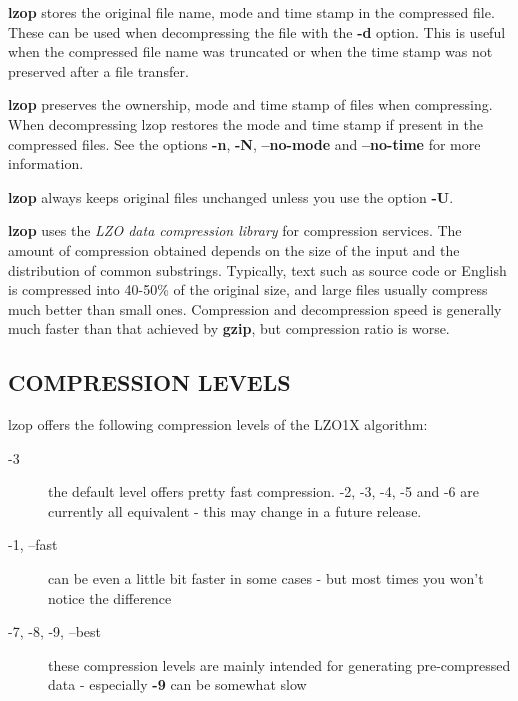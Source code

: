 \textbf{lzop} stores the original file name, mode and time stamp
in the compressed file. These can be used when
decompressing the file with the \textbf{-d} option. This is useful when
the compressed file name was truncated or when the time
stamp was not preserved after a file transfer.



\textbf{lzop} preserves the ownership, mode and time stamp of files
when compressing. When decompressing lzop restores the
mode and time stamp if present in the compressed files.
See the options \textbf{-n}, \textbf{-N}, \textbf{--no-mode} and \textbf{--no-time}
for more information.



\textbf{lzop} always keeps original files unchanged unless
you use the option \textbf{-U}.



\textbf{lzop} uses the \textit{LZO data compression library} for compression
services. The amount of compression obtained depends on
the size of the input and the distribution of common substrings.
Typically, text such as source code or English
is compressed into 40-50\% of the original size, and large files usually
compress much better than small ones. Compression and decompression speed
is generally much faster than that achieved by \textbf{gzip}, but
compression ratio is worse.

\subsection*{COMPRESSION LEVELS\label{COMPRESSION_LEVELS}}


lzop offers the following compression levels of the
LZO1X algorithm:

\begin{description}

\item[-3] \mbox{}

the default level offers pretty fast compression.
-2, -3, -4, -5 and -6 are currently all equivalent - this
may change in a future release.


\item[-1, --fast] \mbox{}

can be even a little bit faster in some cases - but
most times you won't notice the difference


\item[-7, -8, -9, --best] \mbox{}

these compression levels are mainly intended for generating
pre-compressed data - especially \textbf{-9} can be somewhat slow

\end{description}


